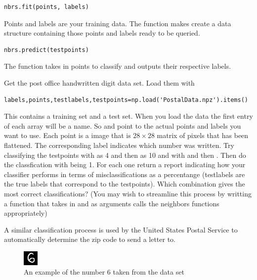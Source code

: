 \begin{lstlisting}
nbrs.fit(points, labels)
\end{lstlisting}
Points and labels are your training data. 
The  function makes  create a data structure containing those points and labels ready to be queried. 

\begin{lstlisting}
nbrs.predict(testpoints)
\end{lstlisting}

The function  takes in points to classify and outputs their respective labels.  
\begin{problem}

Get the post office handwritten digit data set. Load them with
\begin{lstlisting}
labels,points,testlabels,testpoints=np.load('PostalData.npz').items()
\end{lstlisting}
This contains a training set and a test set. 
When you load the data the first entry of each array will be a name. 
So  and  point to the actual points and labels you want to use. 
Each point is a  image that is $28 \times 28$ matrix of pixels that has been flattened. 
The corresponding label indicates which number was written.  
Try classifying the testpoints with  as 4 and then as 10 and with   and then . Then do the classfication with  being 1. 
For each one return a report indicating how your classifier performs in terms of misclassifications as a percentange (testlabels are the true labels that correspond to the testpoints). 
Which combination gives the most correct classifications?
(You may wish to streamline this process by writting a function that takes in  and  as arguments calls the neighbors functions appropriately)


A similar classification process is used by the United States Postal Service to automatically determine the zip code to send a letter to.

\end{problem}

\begin{figure}[h]
\includegraphics[scale = 4]{Example.png}
\caption{An example of the number 6 taken from the data set}
\end{figure}


